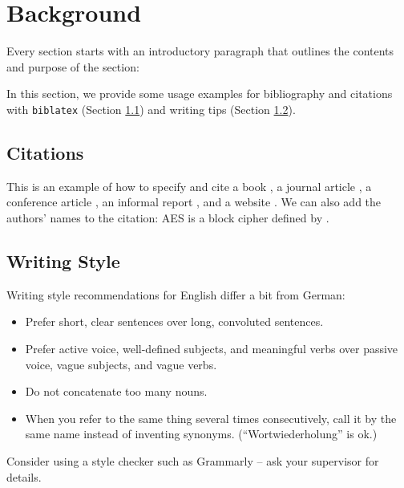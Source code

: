 \documentclass[11pt,
  titlepage=false,
  abstract=on,
]{scrreprt}
\begin{document}

\section{Background}
\label{sec:background}

Every section starts with an introductory paragraph that outlines the contents and purpose of the section:

In this section, we provide some usage examples for bibliography and citations with \texttt{biblatex} (Section \ref{subsec:bib}) and writing tips (Section \ref{subsec:hints}).

\subsection{Citations}
\label{subsec:bib}

This is an example of how to specify and cite
a book \cite{AESbook},
a journal article \cite{bstjShannon49},
a conference article \cite{spKocherHFGGHHLM019},
an informal report \cite{iacrSchneierFKR15},
and a website \cite{webIAIK21}.
We can also add the authors' names to the citation:
AES is a block cipher defined by \textcite{AESbook}.

\subsection{Writing Style}
\label{subsec:hints}

Writing style recommendations for English differ a bit from German:
\begin{itemize}
  \item Prefer short, clear sentences over long, convoluted sentences.
  \item Prefer active voice, well-defined subjects, and meaningful verbs over passive voice, vague subjects, and vague verbs.
  \item Do not concatenate too many nouns.
  \item When you refer to the same thing several times consecutively, call it by the same name instead of inventing synonyms. (``Wortwiederholung'' is ok.)
\end{itemize}
Consider using a style checker such as Grammarly -- ask your supervisor for details.
\end{document}
